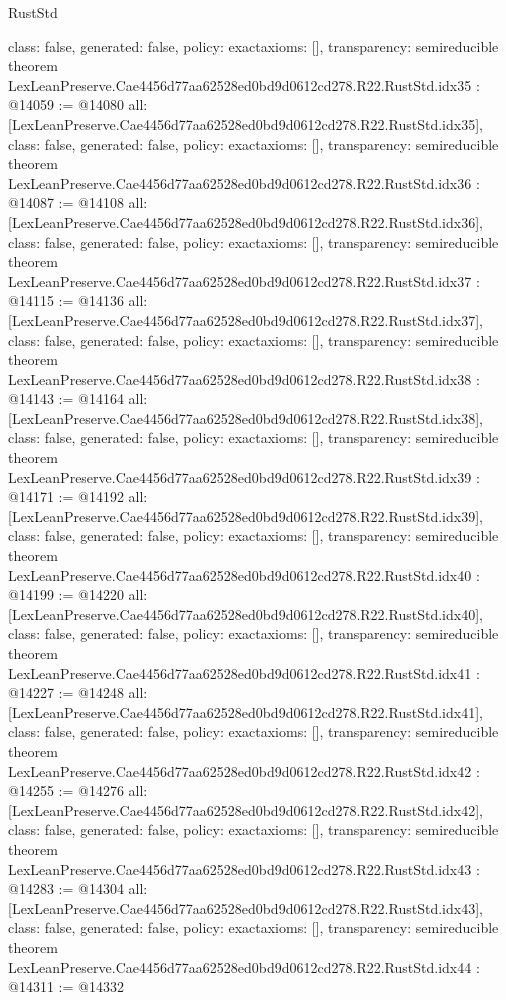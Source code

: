 \begin{lexlean}{RustStd}
\begin{coremodule}
{  class: false,
  generated: false,
  policy: exact{axioms: []},
  transparency: semireducible
}
theorem LexLeanPreserve.Cae4456d77aa62528ed0bd9d0612cd278.R22.RustStd.idx35 : @14059 := @14080 {
  all: [LexLeanPreserve.Cae4456d77aa62528ed0bd9d0612cd278.R22.RustStd.idx35],
  class: false,
  generated: false,
  policy: exact{axioms: []},
  transparency: semireducible
}
theorem LexLeanPreserve.Cae4456d77aa62528ed0bd9d0612cd278.R22.RustStd.idx36 : @14087 := @14108 {
  all: [LexLeanPreserve.Cae4456d77aa62528ed0bd9d0612cd278.R22.RustStd.idx36],
  class: false,
  generated: false,
  policy: exact{axioms: []},
  transparency: semireducible
}
theorem LexLeanPreserve.Cae4456d77aa62528ed0bd9d0612cd278.R22.RustStd.idx37 : @14115 := @14136 {
  all: [LexLeanPreserve.Cae4456d77aa62528ed0bd9d0612cd278.R22.RustStd.idx37],
  class: false,
  generated: false,
  policy: exact{axioms: []},
  transparency: semireducible
}
theorem LexLeanPreserve.Cae4456d77aa62528ed0bd9d0612cd278.R22.RustStd.idx38 : @14143 := @14164 {
  all: [LexLeanPreserve.Cae4456d77aa62528ed0bd9d0612cd278.R22.RustStd.idx38],
  class: false,
  generated: false,
  policy: exact{axioms: []},
  transparency: semireducible
}
theorem LexLeanPreserve.Cae4456d77aa62528ed0bd9d0612cd278.R22.RustStd.idx39 : @14171 := @14192 {
  all: [LexLeanPreserve.Cae4456d77aa62528ed0bd9d0612cd278.R22.RustStd.idx39],
  class: false,
  generated: false,
  policy: exact{axioms: []},
  transparency: semireducible
}
theorem LexLeanPreserve.Cae4456d77aa62528ed0bd9d0612cd278.R22.RustStd.idx40 : @14199 := @14220 {
  all: [LexLeanPreserve.Cae4456d77aa62528ed0bd9d0612cd278.R22.RustStd.idx40],
  class: false,
  generated: false,
  policy: exact{axioms: []},
  transparency: semireducible
}
theorem LexLeanPreserve.Cae4456d77aa62528ed0bd9d0612cd278.R22.RustStd.idx41 : @14227 := @14248 {
  all: [LexLeanPreserve.Cae4456d77aa62528ed0bd9d0612cd278.R22.RustStd.idx41],
  class: false,
  generated: false,
  policy: exact{axioms: []},
  transparency: semireducible
}
theorem LexLeanPreserve.Cae4456d77aa62528ed0bd9d0612cd278.R22.RustStd.idx42 : @14255 := @14276 {
  all: [LexLeanPreserve.Cae4456d77aa62528ed0bd9d0612cd278.R22.RustStd.idx42],
  class: false,
  generated: false,
  policy: exact{axioms: []},
  transparency: semireducible
}
theorem LexLeanPreserve.Cae4456d77aa62528ed0bd9d0612cd278.R22.RustStd.idx43 : @14283 := @14304 {
  all: [LexLeanPreserve.Cae4456d77aa62528ed0bd9d0612cd278.R22.RustStd.idx43],
  class: false,
  generated: false,
  policy: exact{axioms: []},
  transparency: semireducible
}
theorem LexLeanPreserve.Cae4456d77aa62528ed0bd9d0612cd278.R22.RustStd.idx44 : @14311 := @14332 {
}
\end{coremodule}
\end{lexlean}
